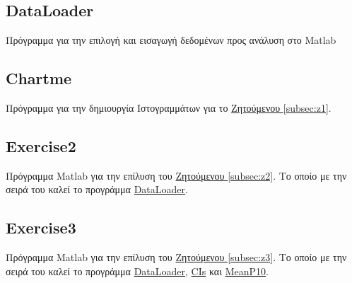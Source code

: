 \documentclass[11pt]{scrartcl} %
\begin{document}
\subsection{DataLoader}
\label{prog:DataLoader}
Πρόγραμμα για την επιλογή και εισαγωγή δεδομένων προς ανάλυση στο Matlab





\subsection{Chartme}
\label{prog:Chartme}
Πρόγραμμα για την δημιουργία Ιστογραμμάτων για το \hyperref[subsec:z1]{Ζητούμενου \ref*{subsec:z1}}.



\subsection{Exercise2}
\label{prog:2}
Πρόγραμμα Matlab για την επίλυση του \hyperref[subsec:z2]{Ζητούμενου \ref*{subsec:z2}}. Το οποίο με την σειρά του καλεί το προγράμμα \hyperref[prog:DataLoader]{DataLoader}.



\subsection{Exercise3}
\label{prog:3}
Πρόγραμμα Matlab για την επίλυση του \hyperref[subsec:z3]{Ζητούμενου \ref*{subsec:z3}}. Το οποίο με την σειρά του καλεί το προγράμμα \hyperref[prog:DataLoader]{DataLoader}, \hyperref[prog:CIs]{CIs} και \hyperref[prog:MeanP10]{MeanP10}.

\end{document}
